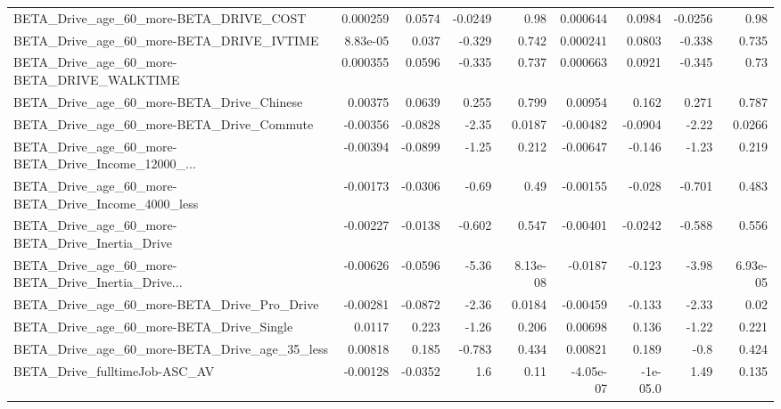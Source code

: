 \begin{tabular}{lrrrrrrrr}
BETA\_Drive\_age\_60\_more-BETA\_DRIVE\_COST             &    0.000259 &       0.0574 &  -0.0249 &     0.98 &   0.000644 &      0.0984 &      -0.0256 &          0.98 \\
BETA\_Drive\_age\_60\_more-BETA\_DRIVE\_IVTIME           &    8.83e-05 &        0.037 &   -0.329 &    0.742 &   0.000241 &      0.0803 &       -0.338 &         0.735 \\
BETA\_Drive\_age\_60\_more-BETA\_DRIVE\_WALKTIME         &    0.000355 &       0.0596 &   -0.335 &    0.737 &   0.000663 &      0.0921 &       -0.345 &          0.73 \\
BETA\_Drive\_age\_60\_more-BETA\_Drive\_Chinese          &     0.00375 &       0.0639 &    0.255 &    0.799 &    0.00954 &       0.162 &        0.271 &         0.787 \\
BETA\_Drive\_age\_60\_more-BETA\_Drive\_Commute          &    -0.00356 &      -0.0828 &    -2.35 &   0.0187 &   -0.00482 &     -0.0904 &        -2.22 &        0.0266 \\
BETA\_Drive\_age\_60\_more-BETA\_Drive\_Income\_12000\_... &    -0.00394 &      -0.0899 &    -1.25 &    0.212 &   -0.00647 &      -0.146 &        -1.23 &         0.219 \\
BETA\_Drive\_age\_60\_more-BETA\_Drive\_Income\_4000\_less &    -0.00173 &      -0.0306 &    -0.69 &     0.49 &   -0.00155 &      -0.028 &       -0.701 &         0.483 \\
BETA\_Drive\_age\_60\_more-BETA\_Drive\_Inertia\_Drive    &    -0.00227 &      -0.0138 &   -0.602 &    0.547 &   -0.00401 &     -0.0242 &       -0.588 &         0.556 \\
BETA\_Drive\_age\_60\_more-BETA\_Drive\_Inertia\_Drive... &    -0.00626 &      -0.0596 &    -5.36 & 8.13e-08 &    -0.0187 &      -0.123 &        -3.98 &      6.93e-05 \\
BETA\_Drive\_age\_60\_more-BETA\_Drive\_Pro\_Drive        &    -0.00281 &      -0.0872 &    -2.36 &   0.0184 &   -0.00459 &      -0.133 &        -2.33 &          0.02 \\
BETA\_Drive\_age\_60\_more-BETA\_Drive\_Single           &      0.0117 &        0.223 &    -1.26 &    0.206 &    0.00698 &       0.136 &        -1.22 &         0.221 \\
BETA\_Drive\_age\_60\_more-BETA\_Drive\_age\_35\_less      &     0.00818 &        0.185 &   -0.783 &    0.434 &    0.00821 &       0.189 &         -0.8 &         0.424 \\
BETA\_Drive\_fulltimeJob-ASC\_AV                      &    -0.00128 &      -0.0352 &      1.6 &     0.11 &  -4.05e-07 &    -1e-05.0 &         1.49 &         0.135 \\

\end{tabular}
